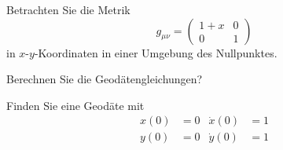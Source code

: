 Betrachten Sie die Metrik
\[
g_{\mu\nu}
=
\begin{pmatrix}
1+x&0\\
0  &1
\end{pmatrix}
\]
in $x$-$y$-Koordinaten in einer Umgebung des Nullpunktes.
\begin{teilaufgaben}
\item
Berechnen Sie die Geodätengleichungen?
\item
Finden Sie eine Geodäte mit
\begin{equation}
\begin{aligned}
x(0)&=0&\dot x(0)&=1\\
y(0)&=0&\dot y(0)&=1
\end{aligned}
\label{uebung:0301:anfangswerte}
\end{equation}
\end{teilaufgaben}

